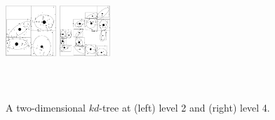 \documentclass{article}
\begin{document}
\begin{figure}
  \begin{minipage}{1.8in}
    \begin{minipage}{0.8in}
      \includegraphics[width=0.75in,height=1.0in]{kdtree-level2.ps}
    \end{minipage}
    \begin{minipage}{0.8in}
      \includegraphics[width=0.75in,height=1.0in]{kdtree-level4.ps}
    \end{minipage}
    \\
    \begin{minipage}{1.6in}
      \footnotesize{\caption{\label{fig:kdtree} A two-dimensional
	  $kd$-tree at (left) level 2 and (right) level 4.}}
    \end{minipage}
  \end{minipage}
\end{figure}
\end{document}
